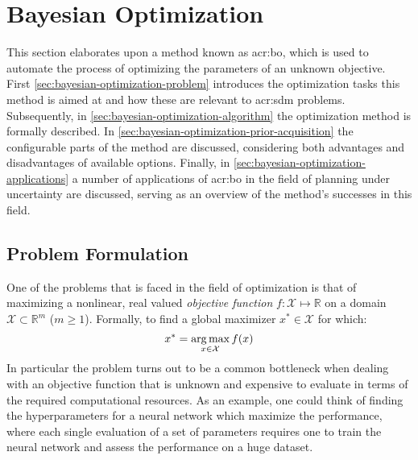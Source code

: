\section{Bayesian Optimization}
\label{sec:bayesian-optimization}

This section elaborates upon a method known as \acrfull{acr:bo}, which is used to automate the process of optimizing the parameters of an unknown objective.
First \autoref{sec:bayesian-optimization-problem} introduces the optimization tasks this method is aimed at and how these are relevant to \acrshort{acr:sdm} problems.
Subsequently, in \autoref{sec:bayesian-optimization-algorithm} the optimization method is formally described.
In \autoref{sec:bayesian-optimization-prior-acquisition} the configurable parts of the method are discussed, considering both advantages and disadvantages of available options.
Finally, in \autoref{sec:bayesian-optimization-applications} a number of applications of \acrlong{acr:bo} in the field of planning under uncertainty are discussed, serving as an overview of the method's successes in this field.


\subsection{Problem Formulation}
\label{sec:bayesian-optimization-problem}

One of the problems that is faced in the field of optimization is that of maximizing a nonlinear, real valued \textit{objective function} $f: \mathcal{X} \mapsto \mathbb{R}$ on a domain $\mathcal{X} \subset \mathbb{R}^m$ ($m \geq 1$).
Formally, to find a global maximizer $x^\ast \in \mathcal{X}$ for which:
\begin{equation}
	x^\ast = \operatorname*{arg\,max}_{x \in \mathcal{X}} f(x)
\end{equation}
In particular the problem turns out to be a common bottleneck when dealing with an objective function that is unknown and expensive to evaluate in terms of the required computational resources.
As an example, one could think of finding the hyperparameters for a neural network which maximize the performance, where each single evaluation of a set of parameters requires one to train the neural network and assess the performance on a huge dataset.

